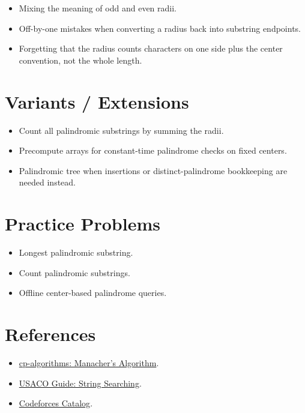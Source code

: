 \begin{itemize}
  \item Mixing the meaning of odd and even radii.
  \item Off-by-one mistakes when converting a radius back into substring endpoints.
  \item Forgetting that the radius counts characters on one side plus the center convention, not the whole length.
\end{itemize}

\section*{Variants / Extensions}

\begin{itemize}
  \item Count all palindromic substrings by summing the radii.
  \item Precompute arrays for constant-time palindrome checks on fixed centers.
  \item Palindromic tree when insertions or distinct-palindrome bookkeeping are needed instead.
\end{itemize}

\section*{Practice Problems}

\begin{itemize}
  \item Longest palindromic substring.
  \item Count palindromic substrings.
  \item Offline center-based palindrome queries.
\end{itemize}

\section*{References}

\begin{itemize}
  \item \href{https://cp-algorithms.com/string/manacher.html}{cp-algorithms: Manacher's Algorithm}.
  \item \href{https://usaco.guide/adv/string-search}{USACO Guide: String Searching}.
  \item \href{https://codeforces.com/catalog}{Codeforces Catalog}.
\end{itemize}
